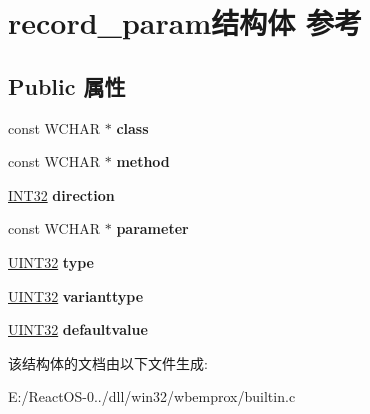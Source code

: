 \hypertarget{structrecord__param}{}\section{record\+\_\+param结构体 参考}
\label{structrecord__param}
\subsection*{Public 属性}
\begin{DoxyCompactItemize}
\item 
\mbox{\label{structrecord__param_a9b3a62c51efa31ce843a4f20d1fdf314}} 
const W\+C\+H\+AR $\ast$ {\bfseries class}
\item 
\mbox{\label{structrecord__param_ac7475bfadd471da1363046cf56470841}} 
const W\+C\+H\+AR $\ast$ {\bfseries method}
\item 
\mbox{\label{structrecord__param_a583bf16b191ece9f1ad953f3f7bfaf26}} 
\hyperlink{_processor_bind_8h_a1137216524060afd426c34677fed058b}{I\+N\+T32} {\bfseries direction}
\item 
\mbox{\label{structrecord__param_a7495fcf451f53c863df624c938686d81}} 
const W\+C\+H\+AR $\ast$ {\bfseries parameter}
\item 
\mbox{\label{structrecord__param_a7aebdf62d4d0f725f019c6116f8140b8}} 
\hyperlink{_processor_bind_8h_ae1e6edbbc26d6fbc71a90190d0266018}{U\+I\+N\+T32} {\bfseries type}
\item 
\mbox{\label{structrecord__param_acee9c7905b7946317e36791bdfc722a0}} 
\hyperlink{_processor_bind_8h_ae1e6edbbc26d6fbc71a90190d0266018}{U\+I\+N\+T32} {\bfseries varianttype}
\item 
\mbox{\label{structrecord__param_af0ab3e0c9c7039e9d1eaff2954dea5a5}} 
\hyperlink{_processor_bind_8h_ae1e6edbbc26d6fbc71a90190d0266018}{U\+I\+N\+T32} {\bfseries defaultvalue}
\end{DoxyCompactItemize}


该结构体的文档由以下文件生成\+:\begin{DoxyCompactItemize}
\item 
E\+:/\+React\+O\+S-\/0../dll/win32/wbemprox/builtin.\+c\end{DoxyCompactItemize}
